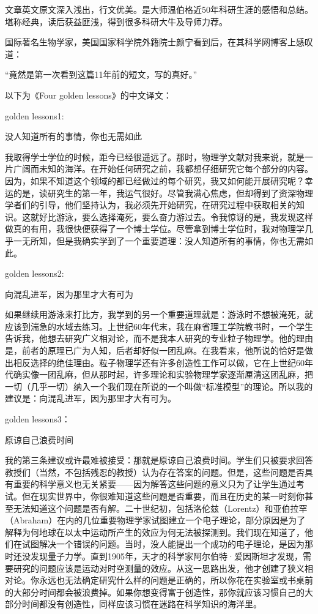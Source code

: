文章英文原文深入浅出，行文优美。是大师温伯格近50年科研生涯的感悟和总结。堪称经典，读后获益匪浅，得到很多科研大牛及导师力荐。



国际著名生物学家，美国国家科学院外籍院士颜宁看到后，在其科学网博客上感叹道：

“竟然是第一次看到这篇11年前的短文，写的真好。”



以下为《Four golden lessons》的中文译文：

golden lessons1:

没人知道所有的事情，你也无需如此


我取得学士学位的时候，距今已经很遥远了。那时，物理学文献对我来说，就是一片广阔而未知的海洋。在开始任何研究之前，我都想仔细研究它每个部分的内容。因为，如果不知道这个领域的都已经做过的每个研究，我又如何能开展研究呢？幸运的是，读研究生的第一年，我运气很好。尽管我满心焦虑，但却得到了资深物理学者们的引导，他们坚持认为，我必须先开始研究，在研究过程中获取相关的知识。这就好比游泳，要么选择淹死，要么奋力游过去。令我惊讶的是，我发现这样做真的有用，我很快便获得了一个博士学位。尽管拿到博士学位时，我对物理学几乎一无所知，但是我确实学到了一个重要道理：没人知道所有的事情，你也无需如此。

golden lessons2:

向混乱进军，因为那里才大有可为


如果继续用游泳来打比方，我学到的另一个重要道理就是：游泳时不想被淹死，就应该到湍急的水域去练习。上世纪60年代末，我在麻省理工学院教书时，一个学生告诉我，他想去研究广义相对论，而不是我本人研究的专业粒子物理学。他的理由是，前者的原理已广为人知，后者却好似一团乱麻。在我看来，他所说的恰好是做出相反选择的绝佳理由。粒子物理学还有许多创造性工作可以做，它在上世纪60年代确实像一团乱麻，但从那时起，许多理论和实验物理学家逐渐厘清这团乱麻，把一切（几乎一切）纳入一个我们现在所说的一个叫做“标准模型”的理论。所以我的建议是：向混乱进军，因为那里才大有可为。

golden lessons3：

原谅自己浪费时间


我的第三条建议或许最难被接受：那就是原谅自己浪费时间。学生们只被要求回答教授们（当然，不包括残忍的教授）认为存在答案的问题。但是，这些问题是否具有重要的科学意义也无关紧要——因为解答这些问题的意义只为了让学生通过考试。但在现实世界中，你很难知道这些问题是否重要，而且在历史的某一时刻你甚至无法知道这个问题是否有解。二十世纪初，包括洛伦兹（Lorentz）和亚伯拉罕（Abraham）在内的几位重要物理学家试图建立一个电子理论，部分原因是为了解释为何地球在以太中运动所产生的效应为何无法被探测到。我们现在知道了，他们在试图解决一个错误的问题。当时，没人能提出一个成功的电子理论，是因为那时还没发现量子力学。直到1905年，天才的科学家阿尔伯特·爱因斯坦才发现，需要研究的问题应该是运动对时空测量的效应。从这一思路出发，他才创建了狭义相对论。你永远也无法确定研究什么样的问题是正确的，所以你花在实验室或书桌前的大部分时间都会被浪费掉。如果你想变得富于创造性，那你就应该习惯自己的大部分时间都没有创造性，同样应该习惯在迷路在科学知识的海洋里。

